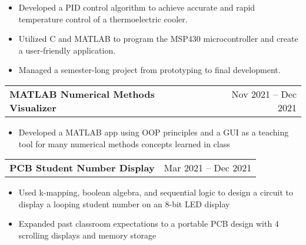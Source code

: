 \documentclass[a4paper,10pt]{article}
\begin{document}
\begin{itemize}[nosep,after=\strut, leftmargin=1em, itemsep=3pt,label=--]
  \item Developed a PID control algorithm to achieve accurate and rapid temperature control of a thermoelectric cooler.
\item Utilized C and MATLAB to program the MSP430 microcontroller and create a user-friendly application.
\item Managed a semester-long project from prototyping to final development.
\end{itemize}
\begin{tabularx}{\linewidth}{@{}X r@{}}
\begin{minipage}[t]{\linewidth}
  \textbf{MATLAB Numerical Methods Visualizer}
\end{minipage}
&     Nov 2021 -- Dec 2021
\end{tabularx}
\begin{itemize}[nosep,after=\strut, leftmargin=1em, itemsep=3pt,label=--]
  \item Developed a MATLAB app using OOP principles and a GUI as a teaching tool for many numerical methods concepts learned in class
\end{itemize}
\begin{tabularx}{\linewidth}{@{}X r@{}}
\begin{minipage}[t]{\linewidth}
  \textbf{PCB Student Number Display}
\end{minipage}
&     Mar 2021 -- Dec 2021
\end{tabularx}
\begin{itemize}[nosep,after=\strut, leftmargin=1em, itemsep=3pt,label=--]
  \item Used k-mapping, boolean algebra, and sequential logic to design a circuit to display a looping student number on an 8-bit LED display
\item Expanded past classroom expectations to a portable PCB design with 4 scrolling displays and memory storage
\end{itemize}
\end{document}
